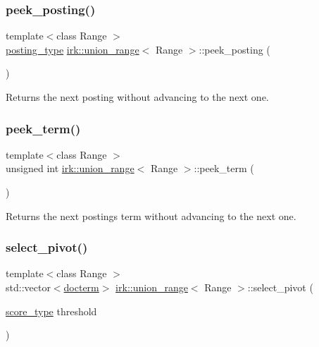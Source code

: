 \subsubsection{\texorpdfstring{peek\+\_\+posting()}{peek\_posting()}}
{\footnotesize\ttfamily template$<$class Range $>$ \\
\mbox{\hyperlink{classirk_1_1union__range_ac125c83e17d473ee5480fef76cfe42f9}{posting\+\_\+type}} \mbox{\hyperlink{classirk_1_1union__range}{irk\+::union\+\_\+range}}$<$ Range $>$\+::peek\+\_\+posting (\begin{DoxyParamCaption}{ }\end{DoxyParamCaption})\hspace{0.3cm}{\ttfamily [inline]}}



Returns the next posting without advancing to the next one. 

\mbox{\label{classirk_1_1union__range_a0b771d0ee6fb2ac3c04be8a2d2d47b33}} 
\subsubsection{\texorpdfstring{peek\+\_\+term()}{peek\_term()}}
{\footnotesize\ttfamily template$<$class Range $>$ \\
unsigned int \mbox{\hyperlink{classirk_1_1union__range}{irk\+::union\+\_\+range}}$<$ Range $>$\+::peek\+\_\+term (\begin{DoxyParamCaption}{ }\end{DoxyParamCaption})\hspace{0.3cm}{\ttfamily [inline]}}



Returns the next posting\textquotesingle{}s term without advancing to the next one. 

\mbox{\label{classirk_1_1union__range_a55d2c36c722c0d865783188eb8e9c584}} 
\subsubsection{\texorpdfstring{select\+\_\+pivot()}{select\_pivot()}}
{\footnotesize\ttfamily template$<$class Range $>$ \\
std\+::vector$<$\mbox{\hyperlink{structirk_1_1union__range_1_1docterm}{docterm}}$>$ \mbox{\hyperlink{classirk_1_1union__range}{irk\+::union\+\_\+range}}$<$ Range $>$\+::select\+\_\+pivot (\begin{DoxyParamCaption}\item[{\mbox{\hyperlink{classirk_1_1union__range_af728218b976df464ebb051a9e5358e93}{score\+\_\+type}}}]{threshold }\end{DoxyParamCaption})\hspace{0.3cm}{\ttfamily [inline]}}

